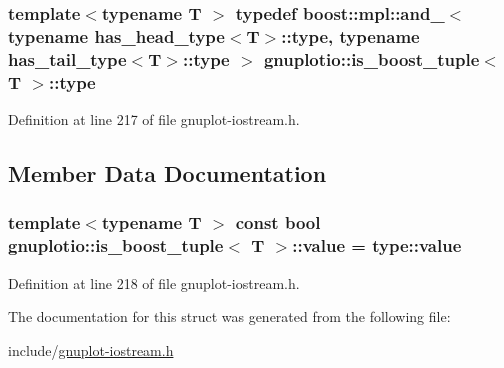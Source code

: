 \subsubsection[{\texorpdfstring{type}{type}}]{\setlength{\rightskip}{0pt plus 5cm}template$<$typename T $>$ typedef boost\+::mpl\+::and\+\_\+$<$ typename has\+\_\+head\+\_\+type$<$T$>$\+::{\bf type}, typename has\+\_\+tail\+\_\+type$<$T$>$\+::{\bf type} $>$ {\bf gnuplotio\+::is\+\_\+boost\+\_\+tuple}$<$ T $>$\+::{\bf type}}\hypertarget{structgnuplotio_1_1is__boost__tuple_ad771f62833b23ecae5dc689e6248396a}{}\label{structgnuplotio_1_1is__boost__tuple_ad771f62833b23ecae5dc689e6248396a}


Definition at line 217 of file gnuplot-\/iostream.\+h.



\subsection{Member Data Documentation}
\subsubsection[{\texorpdfstring{value}{value}}]{\setlength{\rightskip}{0pt plus 5cm}template$<$typename T $>$ const bool {\bf gnuplotio\+::is\+\_\+boost\+\_\+tuple}$<$ T $>$\+::value = type\+::value\hspace{0.3cm}{\ttfamily [static]}}\hypertarget{structgnuplotio_1_1is__boost__tuple_ae6664b02421d28585204104af65a4744}{}\label{structgnuplotio_1_1is__boost__tuple_ae6664b02421d28585204104af65a4744}


Definition at line 218 of file gnuplot-\/iostream.\+h.



The documentation for this struct was generated from the following file\+:\begin{DoxyCompactItemize}
\item 
include/\hyperlink{gnuplot-iostream_8h}{gnuplot-\/iostream.\+h}\end{DoxyCompactItemize}

